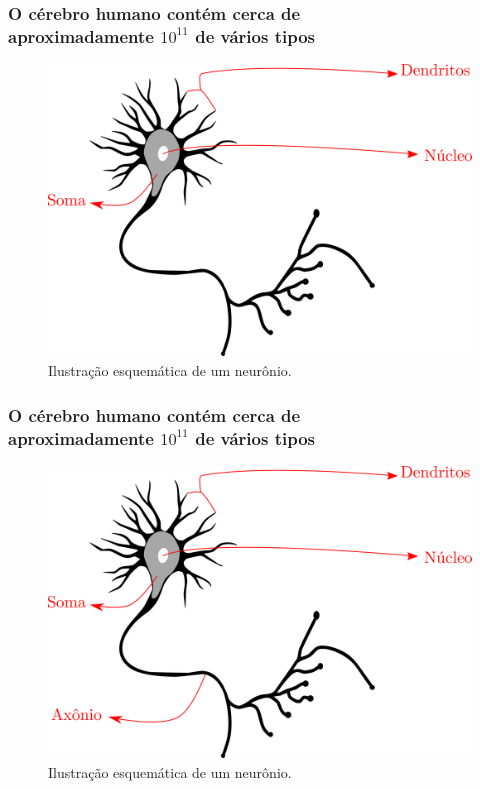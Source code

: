 \documentclass[10pt]{beamer} %
\begin{document}
\begin{frame}
	\frametitle{O cérebro humano contém cerca de \\ aproximadamente $10^{11}$   de vários tipos}
	\begin{figure}
		\centering
		\includegraphics[scale=0.2]{Imagens/soma.png} 
		\caption{Ilustração esquemática de um neurônio.}
	\end{figure}
\end{frame}


\begin{frame}
	\frametitle{O cérebro humano contém cerca de \\ aproximadamente $10^{11}$   de vários tipos}
	\begin{figure}
		\centering
		\includegraphics[scale=0.2]{Imagens/axonio.png} 
		\caption{Ilustração esquemática de um neurônio.}
	\end{figure}
\end{frame}
\end{document}
